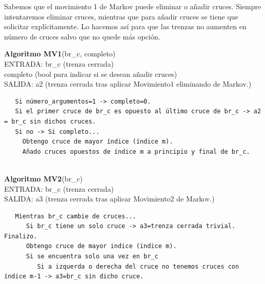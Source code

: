 Sabemos que el movimiento 1 de Markov puede eliminar o añadir cruces. Siempre intentaremos eliminar cruces, mientras que para añadir cruces se tiene que solicitar explícitamente. Lo hacemos así para que las trenzas no aumenten en número de cruces salvo que no quede más opción. \\ 

\begin{alg}
	\textbf{Algoritmo MV1}(br\_c, completo)\\
	ENTRADA: br\_c (trenza cerrada)\\
	\hspace*{2.2cm} completo (bool para indicar si se desean añadir cruces)\\
	SALIDA: \hspace{0.4cm} a2 (trenza cerrada tras aplicar Movimiento1 eliminando de Markov.) 
	
\begin{lstlisting}
   Si número_argumentos=1 -> completo=0.
   Si el primer cruce de br_c es opuesto al último cruce de br_c -> a2 = br_c sin dichos cruces.
   Si no -> Si completo... 
     Obtengo cruce de mayor índice (índice m).
     Añado cruces opuestos de índice m a principio y final de br_c.
      
\end{lstlisting}
\end{alg}

\begin{alg}
	\textbf{Algoritmo MV2}(br\_c)\\
	ENTRADA: br\_c (trenza cerrada)\\
	SALIDA: \hspace{0.4cm} a3 (trenza cerrada tras aplicar Movimiento2 de Markov.) 
	
\begin{lstlisting}
   Mientras br_c cambie de cruces...
      Si br_c tiene un solo cruce -> a3=trenza cerrada trivial. Finalizo.
      Obtengo cruce de mayor indice (indice m). 
      Si se encuentra solo una vez en br_c
         Si a izquerda o derecha del cruce no tenemos cruces con índice m-1 -> a3=br_c sin dicho cruce.
         
\end{lstlisting}
\end{alg}

